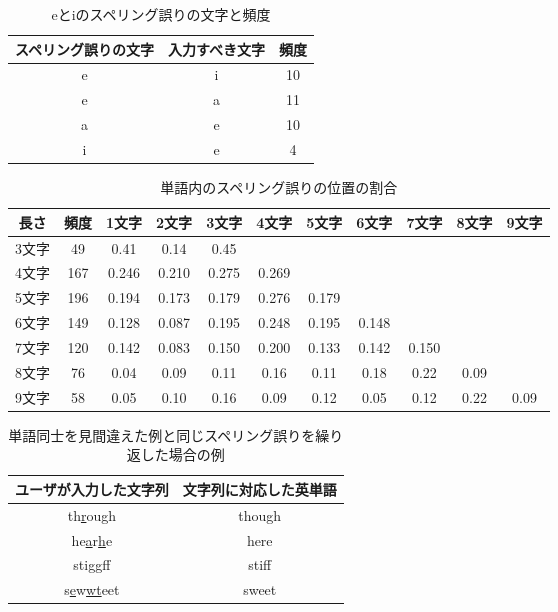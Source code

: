  \begin{table}[t]
  \small
  \begin{center}
   \caption{eとiのスペリング誤りの文字と頻度}
   \begin{tabular}{|c|c|c|} \hline
       	スペリング誤りの文字 & 入力すべき文字 & 頻度\\ \hline
	    e & i & 10\\ \hline
	    e & a & 11\\ \hline
	    a & e & 10\\ \hline
	    i & e & 4\\ \hline
   \end{tabular}
  \end{center}
 \end{table}

 \begin{table}[t]
  \small
  \centering
   \caption{単語内のスペリング誤りの位置の割合}
   \begin{tabular}{|c|c|c|c|c|c|c|c|c|c|c|} \hline
       	長さ & 頻度 & 1文字 & 2文字 & 3文字 & 4文字 & 5文字 & 6文字 & 7文字 & 8文字 & 9文字\\ \hline
	    3文字 & 49 & 0.41 & 0.14 & 0.45 &  &  &  &  &  & \\ \hline
	    4文字 & 167 & 0.246 & 0.210 & 0.275 & 0.269 &  &  &  &  & \\ \hline
	    5文字 & 196 & 0.194 & 0.173 & 0.179 & 0.276 & 0.179 &  &  &  & \\ \hline
	    6文字 & 149 & 0.128 & 0.087 & 0.195 & 0.248 & 0.195 & 0.148 &  &  & \\ \hline
	    7文字 & 120 & 0.142 & 0.083 & 0.150 & 0.200 & 0.133 & 0.142 & 0.150 &  & \\ \hline
	    8文字 & 76 & 0.04 & 0.09 & 0.11 & 0.16 & 0.11 & 0.18 & 0.22 & 0.09 & \\ \hline
	    9文字 & 58 & 0.05 & 0.10 & 0.16 & 0.09 & 0.12 & 0.05 & 0.12 & 0.22 & 0.09 \\ \hline
   \end{tabular}
 \end{table}

 \begin{table*}[t]
  \small
  \begin{center}
   \caption{単語同士を見間違えた例と同じスペリング誤りを繰り返した場合の例}
   \begin{tabular}{|c|c|} \hline
       	ユーザが入力した文字列 & 文字列に対応した英単語\\ \hline
	    th\underline{r}ough & though\\ \hline
	    he\underline{a}r\underline{h}e & here\\ \hline
	    sti\underline{gg}ff & stiff\\ \hline
	    s\underline{e}w\underline{wt}eet & sweet\\ \hline
   \end{tabular}
  \end{center}
 \end{table*}

